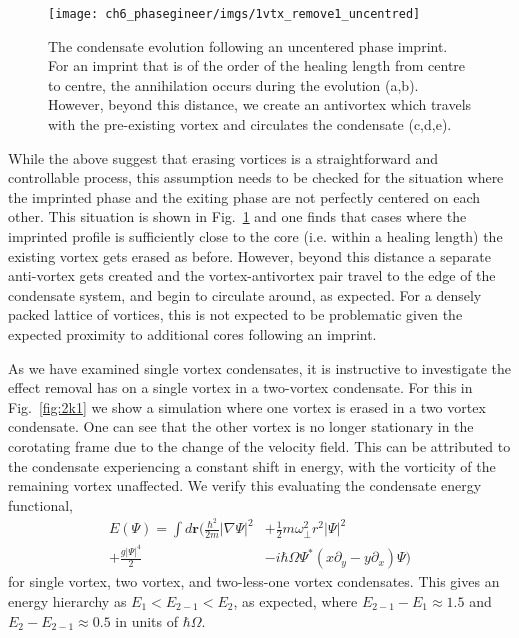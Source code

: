 \begin{figure} \centering
    \texttt{[image: ch6\_phasegineer/imgs/1vtx\_remove1\_uncentred]}
    \caption{The condensate evolution following an uncentered phase imprint. For an imprint that is of the order of the healing length from centre to centre, the annihilation occurs during the evolution (a,b). However, beyond this distance, we create an antivortex which travels with the pre-existing vortex and circulates the condensate (c,d,e).}\label{fig:annihilation_1vtx_uncentred}
\end{figure}

While the above suggest that erasing vortices is a straightforward and controllable process, this assumption needs to be checked for the situation where the imprinted phase and the exiting phase are not perfectly centered on each other.
This situation is shown in Fig.~\ref{fig:annihilation_1vtx_uncentred} and one finds that cases where the imprinted profile is sufficiently close to the core (i.e. within a healing length) the existing vortex gets erased as before. However, beyond this distance a separate anti-vortex gets created and the vortex-antivortex pair travel to the edge of the condensate system, and begin to circulate around, as expected. For a densely packed lattice of vortices, this is not expected to be problematic given the expected proximity to additional cores following an imprint. %

As we have examined single vortex condensates, it is instructive to investigate the effect removal has on a single vortex in a two-vortex condensate. For this in Fig.~\ref{fig:2k1} we show a simulation where one vortex is erased in a two vortex condensate. One can see that the other vortex is no longer stationary in the corotating frame due to the change of the velocity field. This can be attributed to the condensate experiencing a constant shift in energy, with the vorticity of the remaining vortex unaffected. We verify this evaluating the condensate energy functional,
\begin{align}
    E(\Psi) = \int d\mathbf{r} \biggl( \frac{\hbar^2}{2m}|\nabla\Psi|^2 &+  \frac{1}{2}m\omega_\perp^2r^2|\Psi|^2 \nonumber\\ + \frac{g|\Psi|^4}{2} &- i\hbar\Omega\Psi^{*}(x\partial_y - y\partial_x)\Psi \biggr)
\end{align}
 for single vortex, two vortex, and two-less-one vortex condensates. This gives an energy hierarchy as $E_1 < E_{2-1} < E_2$, as expected, where $E_{2-1}-E_1\approx1.5$ and $E_2-E_{2-1}\approx 0.5$ in units of $\hbar\Omega$.

